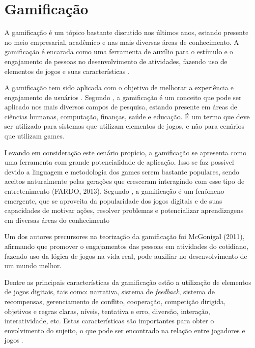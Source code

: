 \documentclass[
	12pt,				%
	oneside,			%
	a4paper,			%
	english,			%
	french,				%
	spanish,			%
	brazil,				%
	]{abntex2}
\begin{document}
\chapter{Gamificação}

A gamificação é um tópico bastante discutido nos últimos anos, estando presente no meio empresarial, acadêmico e nas mais diversas áreas de conhecimento. A gamificação é encarada como uma ferramenta de auxílio para o estímulo e o engajamento de pessoas no desenvolvimento de atividades, fazendo uso de elementos de jogos e suas características \cite{quadros2016gamificaccao}.

A gamificação tem sido aplicada com o objetivo de melhorar a experiência e engajamento de usuários \cite{quadros2016gamificaccao}. Segundo \citet{deterding2011game}, a gamificação é um conceito que pode ser aplicado nos mais diversos campos de pesquisa, estando presente em áreas de ciências humanas, computação, finanças, saúde e educação. É um termo que deve ser utilizado para sistemas que utilizam elementos de jogos, e não para cenários que utilizam games. 

Levando em consideração este cenário propício, a gamificação se apresenta como uma ferramenta com grande potencialidade de aplicação. Isso se faz possível devido a linguagem e metodologia dos games serem bastante populares, sendo aceitos naturalmente pelas gerações que cresceram interagindo com esse tipo de entretenimento (FARDO, 2013). Segundo \citet{deterding2011game}, a gamificação é um fenômeno emergente, que se aproveita da popularidade dos jogos digitais e de suas capacidades de motivar ações, resolver problemas e potencializar aprendizagens em diversas áreas do conhecimento

Um dos autores precursores na teorização da gamificação foi McGonigal (2011), afirmando que promover o engajamentos das pessoas em atividades do cotidiano, fazendo uso da lógica de jogos na vida real, pode auxiliar no desenvolvimento de um mundo melhor.

Dentre as principais características da gamificação estão a utilização de elementos de jogos digitais, tais como: narrativa, sistema de \textit{feedback}, sistema de recompensas, gerenciamento de conflito, cooperação, competição dirigida, objetivos e regras claras, níveis, tentativa e erro, diversão, interação, interatividade, etc. Estas características são importantes para obter o envolvimento do sujeito, o que pode ser encontrado na relação entre jogadores e jogos \cite{deterding2011game}.
\end{document}
